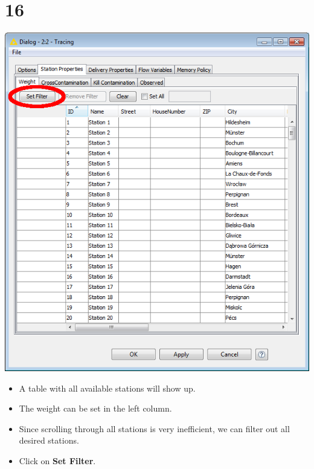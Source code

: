 \documentclass[10pt]{beamer}
\begin{document}
\section{16}
\begin{frame}
	\begin{center}
  		\includegraphics[height=0.6\textheight]{16.png}
	\end{center}
	\begin{itemize}
		\item A table with all available stations will show up.
		\item The weight can be set in the left column.
		\item Since scrolling through all stations is very inefficient, we can filter out all desired stations.
		\item Click on \textbf{Set Filter}.
	\end{itemize}
\end{frame}
\end{document}
